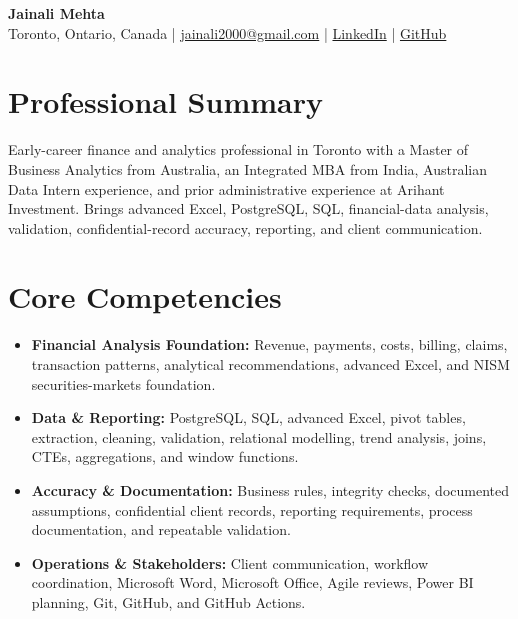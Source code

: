 \documentclass[letterpaper,10pt]{article}
\begin{document}
\begin{center}
  {\fontsize{17}{19}\selectfont\textbf{Jainali Mehta}}\\[2pt]
  \small Toronto, Ontario, Canada \;|\;
  \href{mailto:jainali2000@gmail.com}{jainali2000@gmail.com} \;|\;
  \href{https://www.linkedin.com/in/jainali-mehta}{LinkedIn} \;|\;
  \href{https://github.com/jainalimehta}{GitHub}
\end{center}
\vspace{-7pt}

\section{Professional Summary}
\small Early-career finance and analytics professional in Toronto with a Master of Business Analytics from Australia, an Integrated MBA from India, Australian Data Intern experience, and prior administrative experience at Arihant Investment. Brings advanced Excel, PostgreSQL, SQL, financial-data analysis, validation, confidential-record accuracy, reporting, and client communication.

\section{Core Competencies}
\begin{itemize}[leftmargin=0.16in,label=\textbullet,topsep=0pt,itemsep=1pt,parsep=0pt]
  \item \small \textbf{Financial Analysis Foundation:} Revenue, payments, costs, billing, claims, transaction patterns, analytical recommendations, advanced Excel, and NISM securities-markets foundation.
  \item \small \textbf{Data \& Reporting:} PostgreSQL, SQL, advanced Excel, pivot tables, extraction, cleaning, validation, relational modelling, trend analysis, joins, CTEs, aggregations, and window functions.
  \item \small \textbf{Accuracy \& Documentation:} Business rules, integrity checks, documented assumptions, confidential client records, reporting requirements, process documentation, and repeatable validation.
  \item \small \textbf{Operations \& Stakeholders:} Client communication, workflow coordination, Microsoft Word, Microsoft Office, Agile reviews, Power BI planning, Git, GitHub, and GitHub Actions.
\end{itemize}
\end{document}
